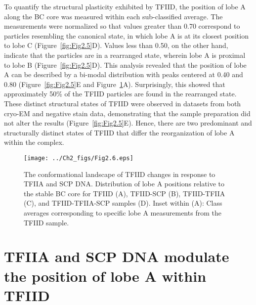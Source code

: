 \indent To quantify the structural plasticity exhibited by TFIID, the position of lobe A along the BC core was measured within each sub-classified average. The measurements were normalized so that values greater than 0.70 correspond to particles resembling the canonical state, in which lobe A is at its closest position to lobe C (Figure~\ref{fig:Fig2.5}D). Values less than 0.50, on the other hand, indicate that the particles are in a rearranged state, wherein lobe A is proximal to lobe B (Figure~\ref{fig:Fig2.5}D). This analysis revealed that the position of lobe A can be described by a bi-modal distribution with peaks centered at 0.40 and 0.80 (Figure~\ref{fig:Fig2.5}E and Figure~\ref{fig:Fig2.6}A). Surprisingly, this showed that approximately 50\% of the TFIID particles are found in the rearranged state. These distinct structural states of TFIID were observed in datasets from both cryo-EM and negative stain data, demonstrating that the sample preparation did not alter the results (Figure~\ref{fig:Fig2.5}E). Hence, there are two predominant and structurally distinct states of TFIID that differ the reorganization of lobe A within the complex.
\begin{figure}
\centering
\texttt{[image: ../Ch2\_figs/Fig2.6.eps]}
\caption[The conformational landscape of TFIID changes in response to TFIIA and SCP DNA]{The conformational landscape of TFIID changes in response to TFIIA and SCP DNA. Distribution of lobe A positions relative to the stable BC core for TFIID (A), TFIID-SCP (B), TFIID-TFIIA (C), and TFIID-TFIIA-SCP samples (D). Inset within (A): Class averages corresponding to specific lobe A measurements from the TFIID sample.}
\label{fig:Fig2.6}
\end{figure}
\section{TFIIA and SCP DNA modulate the position of lobe A within TFIID}

